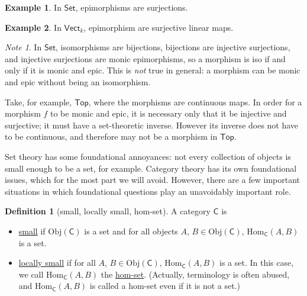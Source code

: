 \documentclass[a4paper,10pt]{scrreprt}
\newcommand{\defn}[1]{\ul{#1}}
\newcommand{\Obj}{\mathrm{Obj}}
\newcommand{\Hom}{\mathrm{Hom}}
\theoremstyle{definition}
\newtheorem{definition}{Definition}[section]
\newtheorem{example}{Example}[section]
\theoremstyle{plain}
\theoremstyle{remark}
\newtheorem{note}{Note}[section]
\begin{document}
\begin{example}
  \label{eg:epimorphismsinkvect}
  In $\mathsf{Set}$, epimorphisms are surjections.
\end{example}

\begin{example}
  In $\mathsf{Vect}_{k}$, epimorphism are surjective linear maps.
\end{example}

\begin{note}
  In $\mathsf{Set}$, isomorphisms are bijections, bijections are injective surjections, and injective surjections are monic epimorphisms, so a morphism is iso if and only if it is monic and epic. This is \emph{not} true in general: a morphism can be monic and epic without being an isomorphism.

  Take, for example, $\mathsf{Top}$, where the morphisms are continuous maps. In order for a morphism $f$ to be monic and epic, it is necessary only that it be injective and surjective; it must have a set-theoretic inverse. However its inverse does not have to be continuous, and therefore may not be a morphism in $\mathsf{Top}$.
\end{note}

Set theory has some foundational annoyances: not every collection of objects is small enough to be a set, for example. Category theory has its own foundational issues, which for the most part we will avoid. However, there are a few important situations in which foundational questions play an unavoidably important role.
\begin{definition}[small, locally small, hom-set]
  \label{def:smalllocallysmallcategoryhomset}
  A category $\mathsf{C}$ is 
  \begin{itemize}
    \item \defn{small} if $\Obj(\mathsf{C})$ is a set and for all objects $A$, $B \in \Obj(\mathsf{C})$, $\Hom_{\mathsf{C}}(A, B)$ is a set.

    \item \defn{locally small} if for all $A$, $B \in \Obj(\mathsf{C})$, $\Hom_{\mathsf{C}}(A, B)$ is a set. In this case, we call $\Hom_{\mathsf{C}}(A, B)$ the \defn{hom-set}. (Actually, terminology is often abused, and $\Hom_{\mathsf{C}}(A, B)$ is called a hom-set even if it is not a set.)
  \end{itemize}
\end{definition}
\end{document}
